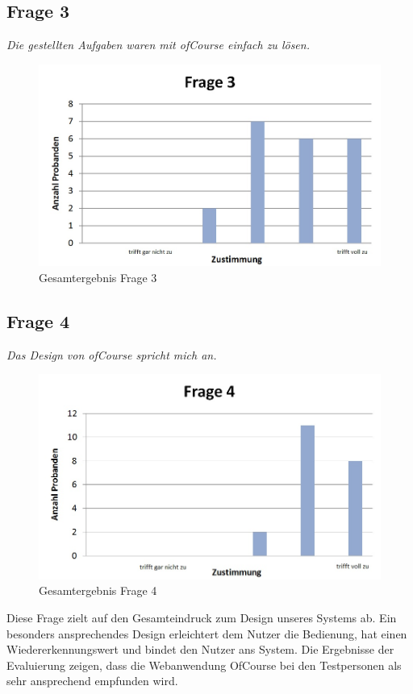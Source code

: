 \subsection{Frage 3}
\begin{center}
	{\it Die gestellten Aufgaben waren mit ofCourse einfach zu lösen.}
\end{center}
\begin{figure}[h]
\centering
\includegraphics[width=0.7\linewidth]{img/Frage3}
\caption{Gesamtergebnis Frage 3}
\label{fig:Frage3}
\end{figure}

\subsection{Frage 4}
\begin{center}
	{\it Das Design von ofCourse spricht mich an.}
\end{center}
\begin{figure}[h]
\centering
\includegraphics[width=0.7\linewidth]{img/Frage4}
\caption{Gesamtergebnis Frage 4}
\label{fig:Frage4}
\end{figure}
Diese Frage zielt auf den Gesamteindruck zum Design unseres Systems ab. Ein besonders ansprechendes Design erleichtert dem Nutzer die Bedienung, hat einen Wiedererkennungswert und bindet den Nutzer ans System. Die Ergebnisse der Evaluierung zeigen, dass die Webanwendung OfCourse bei den Testpersonen als sehr ansprechend empfunden wird.

